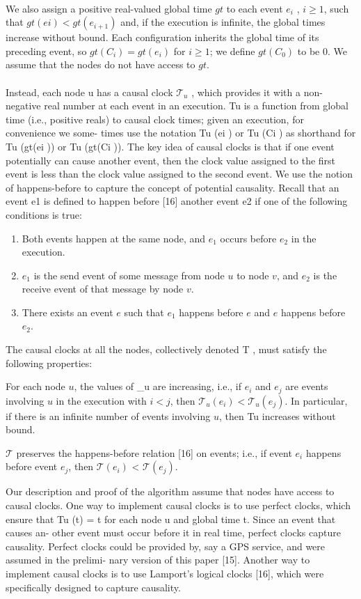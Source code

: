 \paragraph{}We also assign a positive real-valued global time $gt$ to each event $e_i$ , $i \geq 1$, such that $gt(ei) < gt(e_{i+1})$ and, if the execution is infinite, the global times increase without bound. Each configuration inherits the global time of its preceding event, so $gt(C_i) = gt(e_i)$ for $i \geq 1$; we define $gt(C_0)$ to be $0$. We assume that the nodes do not have access to $gt$.
\paragraph{}Instead, each node u has a causal clock $\mathcal{T}_u$ , which provides it with a non-negative real number at each event in an execution. Tu is a function from global time (i.e., positive reals) to causal clock times; given an execution, for convenience we some- times use the notation Tu (ei ) or Tu (Ci ) as shorthand for Tu (gt(ei )) or Tu (gt(Ci )). The key idea of causal clocks is that if one event potentially can cause another event, then the clock value assigned to the first event is less than the clock value assigned to the second event. We use the notion of happens-before to capture the concept of potential causality. Recall that an event e1 is defined to happen before [16] another event e2 if one of the following conditions is true:
\begin{enumerate}
	\item Both events happen at the same node, and $e_1$ occurs before $e_2$ in the execution.
	\item $e_1$ is the send event of some message from node $u$ to node $v$, and $e_2$ is the receive event of that message by node $v$.
	\item There exists an event $e$ such that $e_1$ happens before $e$ and $e$ happens before $e_2$.
\end{enumerate}
The causal clocks at all the nodes, collectively denoted T , must satisfy the following properties:
\begin{list}{--}{spacing}
	\item For each node $u$, the values of _u are increasing, i.e., if $e_i$ and $e_j$ are events involving $u$ in the execution with $i < j$, then $\mathcal{T}_u(e_i) < \mathcal{T}_u(e_j)$. In particular, if there is an infinite number of events involving $u$, then Tu increases without bound.
	\item $\mathcal{T}$ preserves the happens-before relation [16] on events; i.e., if event $e_i$ happens before event $e_j$, then $\mathcal{T}(e_i)$ < $\mathcal{T}(e_j)$.
\end{list}
Our description and proof of the algorithm assume that nodes have access to causal clocks. One way to implement causal clocks is to use perfect clocks, which ensure that Tu (t) = t for each node u and global time t. Since an event that causes an- other event must occur before it in real time, perfect clocks capture causality. Perfect clocks could be provided by, say a GPS service, and were assumed in the prelimi- nary version of this paper [15]. Another way to implement causal clocks is to use Lamport’s logical clocks [16], which were specifically designed to capture causality.
